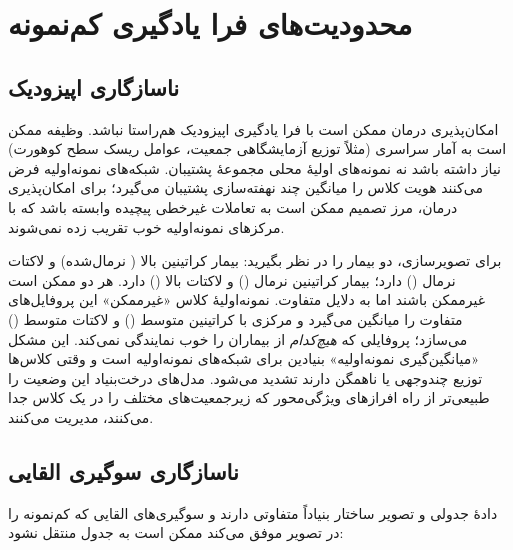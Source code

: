 \section{محدودیت‌های فرا یادگیری کم‌نمونه}

\subsection{ناسازگاری اپیزودیک}

امکان‌پذیری درمان ممکن است با فرا یادگیری اپیزودیک هم‌راستا نباشد. وظیفه ممکن است به آمار سراسری (مثلاً توزیع آزمایشگاهی جمعیت، عوامل ریسک سطح کوهورت) نیاز داشته باشد نه نمونه‌های اولیۀ محلی مجموعۀ پشتیبان. شبکه‌های نمونه‌اولیه فرض می‌کنند هویت کلاس را میانگین چند نهفته‌سازی پشتیبان می‌گیرد؛ برای امکان‌پذیری درمان، مرز تصمیم ممکن است به تعاملات غیرخطی پیچیده وابسته باشد که با مرکزهای نمونه‌اولیه خوب تقریب زده نمی‌شوند.

برای تصویرسازی، دو بیمار را در نظر بگیرید: بیمار  کراتینین بالا ( نرمال‌شده) و لاکتات نرمال () دارد؛ بیمار  کراتینین نرمال () و لاکتات بالا () دارد. هر دو ممکن است غیرممکن باشند اما به دلایل متفاوت. نمونه‌اولیۀ کلاس «غیرممکن» این پروفایل‌های متفاوت را میانگین می‌گیرد و مرکزی با کراتینین متوسط () و لاکتات متوسط () می‌سازد؛ پروفایلی که \emph{هیچ‌کدام} از بیماران را خوب نمایندگی نمی‌کند. این مشکل «میانگین‌گیری نمونه‌اولیه» بنیادین برای شبکه‌های نمونه‌اولیه است و وقتی کلاس‌ها توزیع چندوجهی یا ناهمگن دارند تشدید می‌شود. مدل‌های درخت‌بنیاد این وضعیت را طبیعی‌تر از راه افرازهای ویژگی‌محور که زیرجمعیت‌های مختلف را در یک کلاس جدا می‌کنند، مدیریت می‌کنند.

\subsection{ناسازگاری سوگیری القایی}

دادۀ جدولی و تصویر ساختار بنیاداً متفاوتی دارند و سوگیری‌های القایی که کم‌نمونه را در تصویر موفق می‌کند ممکن است به جدول منتقل نشود:

